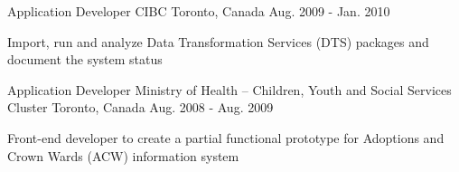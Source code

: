 \begin{cventries}
   \cventry
    {Application Developer}
    {CIBC}
    {Toronto, Canada}
    {Aug. 2009 - Jan. 2010}
    {
      \begin{cvitems}
        \item{Import, run and analyze Data Transformation Services (DTS) packages and document the system status}
      \end{cvitems}
    }
\vspace{-1em} 

  \cventry
    {Application Developer}
    {Ministry of Health – Children, Youth and Social Services Cluster}
    {Toronto, Canada}
    {Aug. 2008 - Aug. 2009}
    {
      \begin{cvitems}
        \item{Front-end developer to create a partial functional prototype for Adoptions and Crown Wards (ACW) information system}
      \end{cvitems}
    }
    
    
    
\end{cventries}
